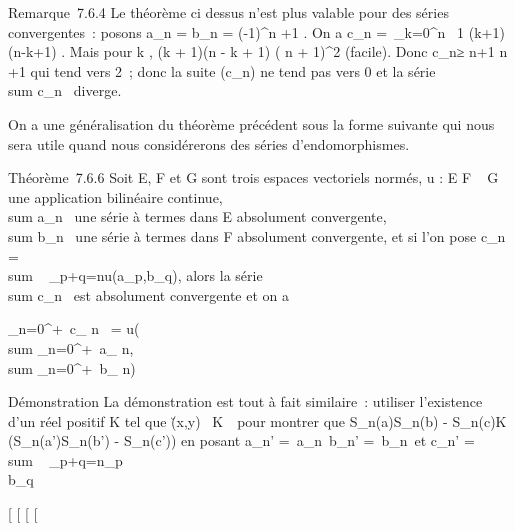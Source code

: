 \documentclass[]{article}
\begin{document}
Remarque~7.6.4 Le théorème ci dessus n'est plus valable pour des séries
convergentes~: posons a_n = b_n = (-1)^n
\over \sqrtn+1 . On a
c_n =\
\sum  _k=0^n~ 1
\over \sqrt(k+1)(n-k+1) . Mais pour
k \in [0,n], (k + 1)(n - k + 1) \leq ( n  +
1)^2 (facile). Donc c_n≥ n+1
\over  n \over 2 +1 qui tend vers
2~; donc la suite (c_n) ne tend pas vers 0 et la série
\\sum  c_n~
diverge.

On a une généralisation du théorème précédent sous la forme suivante qui
nous sera utile quand nous considérerons des séries d'endomorphismes.

Théorème~7.6.6 Soit E, F et G sont trois espaces vectoriels normés, u :
E \times F \rightarrow~ G une application bilinéaire continue,
\\sum  a_n~ une
série à termes dans E absolument convergente,
\\sum  b_n~ une
série à termes dans F absolument convergente, et si l'on pose
c_n = \\sum ~
_p+q=nu(a_p,b_q), alors la série
\\sum  c_n~ est
absolument convergente et on a

\sum _n=0^+\infty~c_ n~ =
u\left (\\sum
_n=0^+\infty~a_ n,\\sum
_n=0^+\infty~b_ n\right )

Démonstration La démonstration est tout à fait similaire~: utiliser
l'existence d'un réel positif K tel que
\u(x,y)\ \leq
K\x\
\y\ pour montrer que
\left S_n(a)S_n(b) -
S_n(c)\right \leq K\left
(S_n(a')S_n(b') -
S_n(c')\right ) en posant a_n'
=_n\,
b_n' =\
b_n\ et c_n'
= \\sum ~
_p+q=n\a_p\\b_q\

[
[
[
[
\end{document}
